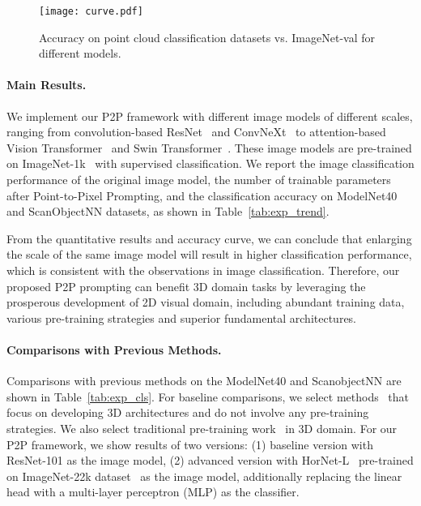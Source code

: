 \documentclass{article}
\begin{document}
\begin{table}[t]
\begin{minipage}{.5\textwidth}
\begin{subtable}{\textwidth}
{    }
\end{subtable}
\end{minipage}
\hfill
\begin{minipage}{.42\textwidth}
\vspace{8pt}
 \begin{subfigure}[b]{\textwidth}
     \centering
     \caption{\footnotesize Accuracy on point cloud classification datasets vs. ImageNet-val for different models.}
     \vspace{-5pt}
     \label{fig:curve}
     \texttt{[image: curve.pdf]}
 \end{subfigure}
\end{minipage}
\end{table}

\paragraph{Main Results.} We implement our P2P framework with different image models of different scales, ranging from convolution-based ResNet~\cite{he2016resnet} and ConvNeXt~\cite{liu2022convnext} to attention-based Vision Transformer~\cite{dosovitskiy2020vit} and Swin Transformer~\cite{liu2021swinv2}. These image models are pre-trained on ImageNet-1k~\cite{deng2009imagenet} with supervised classification. We report the image classification performance of the original image model, the number of trainable parameters after Point-to-Pixel Prompting, and the classification accuracy on ModelNet40 and ScanObjectNN datasets, as shown in Table~\ref{tab:exp_trend}.

From the quantitative results and accuracy curve, we can conclude that enlarging the scale of the same image model will result in higher classification performance, which is consistent with the observations in image classification. Therefore, our proposed P2P prompting can benefit 3D domain tasks by leveraging the prosperous development of 2D visual domain, including abundant training data, various pre-training strategies and superior fundamental architectures.

\paragraph{Comparisons with Previous Methods.} 

Comparisons with previous methods on the ModelNet40 and ScanobjectNN are shown in Table~\ref{tab:exp_cls}. For baseline comparisons, we select methods~\cite{qi2017pointnet++, thomas2019kpconv, wang2019dgcnn, ma2022pointmlp, hamdi2021mvtn, ran2022repsurf, qian2022pointnext} that focus on developing 3D architectures and do not involve any pre-training strategies. We also select traditional pre-training work~\cite{yu2022pointbert, wang2021occo, pang2022pointmae} in 3D domain. For our P2P framework, we show results of two versions: (1) baseline version with ResNet-101 as the image model, (2) advanced version with HorNet-L~\cite{rao2022hornet} pre-trained on ImageNet-22k dataset~\cite{deng2009imagenet} as the image model, additionally replacing the linear head with a multi-layer perceptron (MLP) as the classifier.  
\end{document}

